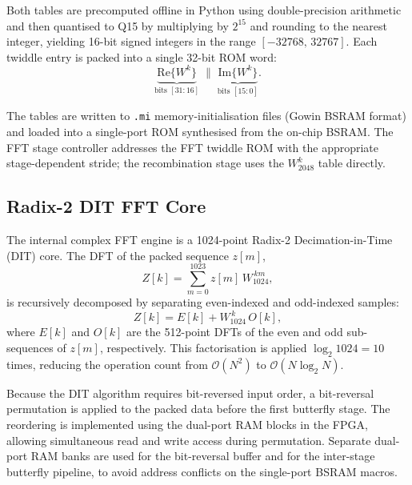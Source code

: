\documentclass[12pt, a4paper]{article}
\begin{document}
Both tables are precomputed offline in Python using double-precision arithmetic
and then quantised to Q15 by multiplying by $2^{15}$ and rounding to the
nearest integer, yielding 16-bit signed integers in the range
$[-32768,\,32767]$.
Each twiddle entry is packed into a single 32-bit ROM word:
\begin{equation}
    \underbrace{\mathrm{Re}\{W^k\}}_{\text{bits }[31:16]}
    \;\|\;
    \underbrace{\mathrm{Im}\{W^k\}}_{\text{bits }[15:0]}.
\end{equation}

The tables are written to \texttt{.mi} memory-initialisation files (Gowin
BSRAM format) and loaded into a single-port ROM synthesised from the on-chip
BSRAM.
The FFT stage controller addresses the FFT twiddle ROM with the appropriate
stage-dependent stride; the recombination stage uses the $W_{2048}^k$ table
directly.

\subsection{Radix-2 DIT FFT Core}
\label{sec:fftcore}

The internal complex FFT engine is a 1024-point Radix-2
Decimation-in-Time (DIT) core.
The DFT of the packed sequence $z[m]$,
\begin{equation}
    Z[k] = \sum_{m=0}^{1023} z[m]\,W_{1024}^{\,km},
\end{equation}
is recursively decomposed by separating even-indexed and odd-indexed samples:
\begin{equation}
    Z[k] = E[k] + W_{1024}^{\,k}\,O[k],
\end{equation}
where $E[k]$ and $O[k]$ are the 512-point DFTs of the even and odd
sub-sequences of $z[m]$, respectively.
This factorisation is applied $\log_2 1024 = 10$ times, reducing the
operation count from $\mathcal{O}(N^2)$ to $\mathcal{O}(N\log_2 N)$.

Because the DIT algorithm requires bit-reversed input order, a bit-reversal
permutation is applied to the packed data before the first butterfly stage.
The reordering is implemented using the dual-port RAM blocks in the FPGA,
allowing simultaneous read and write access during permutation.
Separate dual-port RAM banks are used for the bit-reversal buffer and for
the inter-stage butterfly pipeline, to avoid address conflicts on the
single-port BSRAM macros.

\end{document}

